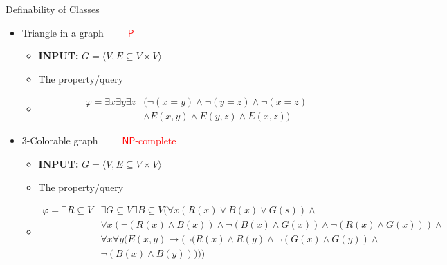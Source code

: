 \documentclass[usenames,dvipsnames]{beamer}
\newcommand\ldiaarg[1]{\langle#1\rangle}
\newcommand{\PTime}{\mathsf{P}}
\newcommand{\NP}{\mathsf{NP}}
\begin{document}
\begin{frame}{Definability of Classes}
    \begin{itemize}
        \item Triangle in a graph~~~~~\textcolor{red}{$\PTime$}
        \begin{itemize}
            \item \textbf{INPUT:} $G = \ldiaarg{V, E\subseteq V\times V}$
            \item The property/query
            \item[]
            \begin{align*}
            \varphi =  \exists x\exists y\exists z &(\neg(x=y)\wedge\neg(y=z)\wedge\neg(x=z)\\
                                                    &\wedge E(x,y)\wedge E(y,z)\wedge E(x,z))
            \end{align*}
        \end{itemize}

        \item 3-Colorable graph~~~~~\textcolor{red}{$\NP$-complete}
        \begin{itemize}
            \item \textbf{INPUT:} $G = \ldiaarg{V, E\subseteq V\times V}$
            \item The property/query
            \item[]
            \begin{align*}
            \varphi =  \exists R\subseteq V&\exists G\subseteq V\exists B\subseteq V (\forall x (R(x)\vee B(x)\vee G(s))\wedge\\
                                            &\forall x (\neg (R(x)\wedge B(x))\wedge\neg(B(x)\wedge G(x))\wedge\neg(R(x)\wedge G(x)))\wedge\\
                                            &\forall x\forall y(E(x,y)\rightarrow(\neg(R(x)\wedge R(y)\wedge\neg(G(x)\wedge G(y))\wedge\\
                                                                                    &\neg(B(x)\wedge B(y)))))
            \end{align*}
        \end{itemize}
    \end{itemize}
\end{frame}
\end{document}
